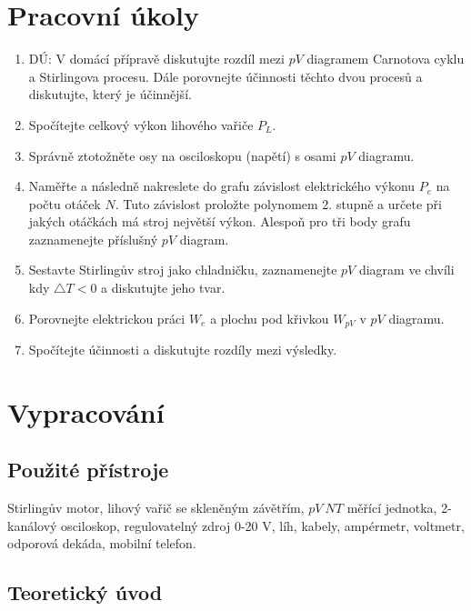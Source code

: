 \documentclass[english]{article}
\begin{document}


\setlength{\parindent}{0.5cm}

\section{Pracovní úkoly}
	\begin{enumerate}
	\item DÚ: V domácí přípravě diskutujte rozdíl mezi $pV$ diagramem Carnotova cyklu a Stirlingova procesu. Dále porovnejte účinnosti těchto dvou procesů a diskutujte, který je účinnější.
	\item Spočítejte celkový výkon lihového vařiče $P_{L}$.
	\item Správně ztotožněte osy na osciloskopu (napětí) s osami $pV$ diagramu.
	\item Naměřte a následně nakreslete do grafu závislost elektrického výkonu $P_{e}$ na počtu otáček $N$. Tuto závislost proložte polynomem 2. stupně a určete při jakých otáčkách má stroj největší výkon. Alespoň pro tři body grafu zaznamenejte příslušný $pV$ diagram.
	\item Sestavte Stirlingův stroj jako chladničku, zaznamenejte $pV$ diagram ve chvíli kdy $\triangle T < 0$ a diskutujte jeho tvar.
	\item Porovnejte elektrickou práci $W_{e}$ a plochu pod křivkou $W_{pV}$ v $pV$ diagramu.
	\item Spočítejte účinnosti a diskutujte rozdíly mezi výsledky.
	\end{enumerate}

\section{Vypracování}

\subsection{Použité přístroje}
	Stirlingův motor, lihový vařič se skleněným závětřím, $pV\ NT$ měřící jednotka, 2-kanálový osciloskop, regulovatelný zdroj 0-20 V, líh, kabely, ampérmetr, voltmetr, odporová dekáda, mobilní telefon.

\subsection{Teoretický úvod}
\end{document}
